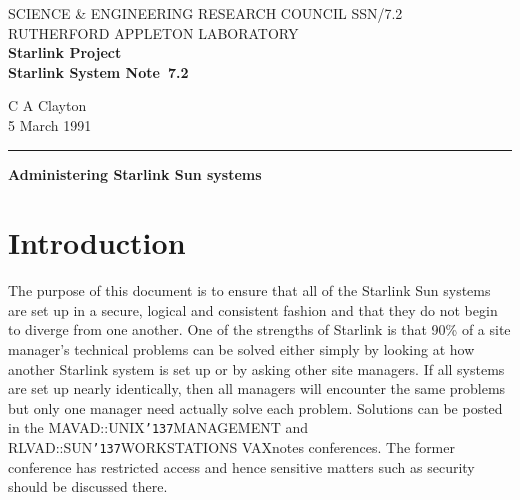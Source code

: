 \pagestyle{myheadings}

\newcommand{\stardoccategory}  {Starlink System Note}
\newcommand{\stardocinitials}  {SSN}
\newcommand{\stardocnumber}    {7.2}
\newcommand{\stardocauthors}   {C A Clayton}
\newcommand{\stardocdate}      {5 March 1991}
\newcommand{\stardoctitle}     {Administering Starlink Sun systems}

\newcommand{\stardocname}{\stardocinitials /\stardocnumber}
\renewcommand{\_}{{\tt\char'137}}     %
\markright{\stardocname}
\setlength{\textwidth}{160mm}
\setlength{\textheight}{240mm}
\setlength{\topmargin}{-5mm}
\setlength{\oddsidemargin}{0mm}
\setlength{\evensidemargin}{0mm}
\setlength{\parindent}{0mm}
\setlength{\parskip}{\medskipamount}
\setlength{\unitlength}{1mm}



\thispagestyle{empty}
SCIENCE \& ENGINEERING RESEARCH COUNCIL \hfill \stardocname\\
RUTHERFORD APPLETON LABORATORY\\
{\large\bf Starlink Project\\}
{\large\bf \stardoccategory\ \stardocnumber}
\begin{flushright}
\stardocauthors\\
\stardocdate
\end{flushright}
\vspace{-4mm}
\rule{\textwidth}{0.5mm}
\vspace{5mm}
\begin{center}
{\Large\bf \stardoctitle}
\end{center}
\vspace{5mm}

\setlength{\parskip}{0mm}
\tableofcontents
\setlength{\parskip}{\medskipamount}
\markright{\stardocname}

\newpage

\section {Introduction}

The purpose of this document is to ensure that all of the Starlink Sun systems
are set up in a secure, logical and consistent fashion and
that they do not begin to diverge from one another. One of the strengths of
Starlink is that 90\% of a site manager's technical problems can be
solved either simply by looking at how another Starlink system is set up or by
asking other site managers. If all systems are set up nearly identically,
then all managers will encounter the same problems but only one manager need
actually solve each problem. Solutions can be posted in the MAVAD::UNIX\_MANAGEMENT
and RLVAD::SUN\_WORKSTATIONS VAXnotes conferences. The former conference
has restricted access and hence sensitive matters such as security
should be discussed there.


